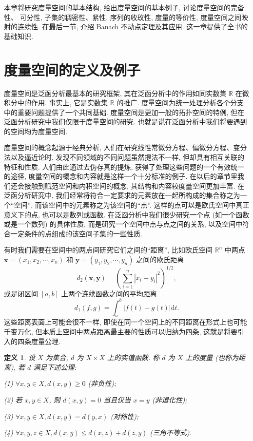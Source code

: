 \documentclass[openany]{ctexbook}
\theoremstyle{kaiti}
\newtheorem{definition}{定义}[section]
\theoremstyle{normal}
\begin{document}
本章将研究度量空间的基本结构, 给出度量空间的基本例子, 讨论度量空间的完备性、 可分性, 子集的稠密性、紧性, 序列的收玫性, 度量的等价性, 度量空间之间映射的连续性. 在最后一节, 介绍 Banach 不动点定理及其应用. 这一章提供了全书的基础知识.

\section{度量空间的定义及例子}

度量空间是泛函分析最基本的研究框架, 其在泛函分析中的作用如同实数集 $\mathbb{R}$ 在微积分中的作用. 事实上, 它是实数集 $\mathbb{R}$ 的推广. 度量空间为统一处理分析各个分支中的重要问题提供了一个共同基础. 度量空间是更加一般的拓扑空间的特例, 但在泛函分析研究中我们仅限于度量空间的研究. 也就是说在泛函分析中我们将要遇到的空间均为度量空间.

度量空间的概念起源于经典分析, 人们在研究线性常微分方程、偏微分方程、变分法以及逼近论时, 发现不同领域的不同问题虽然提法不一样, 但却具有相互关联的特征和性质. 人们由此通过去伪存真的提炼, 获得了处理这些问题的一个有效统一的途径, 度量空间的概念和内容就是这样一个十分标准的例子. 在以后的章节里我们还会接触到赋范空间和内积空间的概念, 其结构和内容较度量空间更加丰富. 在泛函分析研究中, 我们经常将符合一定要求的元素放在一起所构成的集合称之为一个``空间'', 而该空间中的元素称之为该空间的``点''. 这样的点可以是欧氏空间中真正意义下的点, 也可以是数列或函数. 在泛函分析中我们很少研究一个点 (如一个函数或是一个数列) 的具体性质, 而是研究一个空间中点与点之间的关系, 以及空间中符合一定条件的点组成的该空间子集的一些性质.

有时我们需要在空间中的两点间研究它们之间的``距离'', 比如欧氏空间 $\mathbb{R}^n$ 中两点 $\boldsymbol{x}=\left(x_1, x_2, \cdots, x_n\right)$ 和 $\boldsymbol{y}=\left(y_1, y_2, \cdots, y_n\right)$ 之间的欧氏距离
$$
d_2(\boldsymbol{x}, \boldsymbol{y})=\left(\sum_{i=1}^n\left|x_{i}-y_{i}\right|^2\right)^{1 / 2},
$$
或是闭区间 $[a, b]$ 上两个连续函数之间的平均距离
$$
d_1(f, g)=\int_{a}^{b}|f(t)-g(t)| \mathrm{d} t.
$$
这些距离表面上可能会很不一样, 即使在同一个空间上的不同距离在形式上也可能千变万化, 但本质上空间中两点距离最主要的性质可以归纳为四条, 这就是将要引入的四条度量公理.

\begin{definition}
  \label{def:distance}
  设 $X$ 为集合, $d$ 为 $X \times X$ 上的实值函数. 称 $d$ 为 $X$ 上的度量 (也称为距离), 若 $d$ 满足下述公理:

  (1) $\forall x, y \in X, d(x, y) \geqslant 0$ (非负性);

  (2) 若 $x, y \in X$, 则 $d(x, y)=0$ 当且仅当 $x=y$ (非退化性);

  (3) $\forall x, y \in X, d(x, y)=d(y, x)$ (对称性);

  (4) $\forall x, y, z \in X, d(x, y) \leqslant d(x, z)+d(z, y)$ (三角不等式).
\end{definition}
\end{document}
